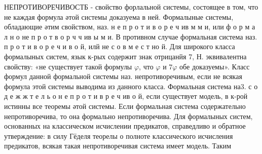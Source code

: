 \documentclass[10pt]{article}
\begin{document}
НЕПРОТИВОРЕЧИВОСТБ - свойство форлальной системы, состоящее в том, что не каждая формула әтой системы доказуема в ней. Формалыные системы, обладающие әтим свойством, наз. н е п р о т и в о р е ч ив м м и, или ф о р м а л н о не п р о т в о р ч ч ив ы м и. В противном случае формальная система наз. п р о т и в о р е ч и в о й, илй не с о в м е с т но й. Для широкого класса формалыных систем, язык к-рых содержит знак отрицанйя 7, Н. эквивалентна свойству: «не существует такой формулы $\varphi$, что $\varphi$ и $7 \varphi$ обе доказуемы». Класс формул данной формальной системы наз. непротиворечивым, если не всякая формула этой системы выводима из данного класса. Формальная система на3. с о д е ж ж т е л ь о н е п р о т и в р е ч ив о й, если существует модель, в к-рой истинны все теоремы әтой системы. Если формальная система содержательно непротиворечива, то она формально непротиворечива. Для формалыных систем, основанных на классическом исчислении предикатов, справедливо и обратное утверждение: в силу Гёделя теорелы о полноте классического исчисления предикатов, всякая такая непротиворечивая система имеет модель. Таким
\end{document}
